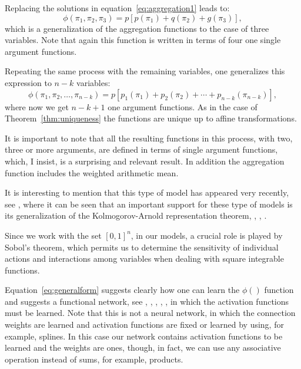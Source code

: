 \documentclass[
	11pt, %
	fleqn, %
	a4paper, %
]{LegrandOrangeBook}
\begin{document}
Replacing the solutions in equation~\eqref{eq:aggregation1} leads to:
\begin{equation}
\phi(\pi_1,\pi_2,\pi_3) = p[p(\pi_1) + q(\pi_2) + g(\pi_3)],
\label{eq:threevarresult}
\end{equation}
which is a generalization of the aggregation functions to the case of three variables. Note that again this function is written in terms of four one single argument functions.

Repeating the same process with the remaining variables, one generalizes this expression to $n-k$ variables:
\begin{equation}
\boxed{\phi(\pi_1,\pi_2,\ldots,\pi_{n-k}) = p[p_1(\pi_1) + p_2(\pi_2) + \cdots + p_{n-k}(\pi_{n-k})],}
\label{eq:generalform}
\end{equation}
where now we get $n-k+1$ one argument functions. As in the case of Theorem~\ref{thm:uniqueness} the functions are unique up to affine transformations.

It is important to note that all the resulting functions in this process, with two, three or more arguments, are defined in terms of single argument functions, which, I insist, is a surprising and relevant result. In addition the aggregation function includes the weighted arithmetic mean.

It is interesting to mention that this type of model has appeared very recently, see \cite{liu2025kan}, where it can be seen that an important support for these type of models is its generalization of the Kolmogorov-Arnold representation theorem, \cite{kolmogorov1956}, \cite{kolmogorov1957}, \cite{braun2009}.

Since we work with the set $[0,1]^n$, in our models, a crucial role is played by Sobol's theorem, which permits us to determine the sensitivity of individual actions and interactions among variables when dealing with square integrable functions.

Equation~\ref{eq:generalform} suggests clearly how one can learn the $\phi()$ function and suggests a functional network, see \cite{Castillo:98}, \cite{CASTILLOG:98}, \cite{CASTILLOCGP:99}, \cite{CastilloCGP:00}, \cite{CASTILLOHLP:08}, in which the activation functions must be learned. Note that this is not a neural network, in which the connection weights are learned and activation functions are fixed or learned by using, for example, splines. In this case our network contains activation functions to be learned and the weights are ones, though, in fact, we can use any associative operation instead of sums, for example, products.
\end{document}
